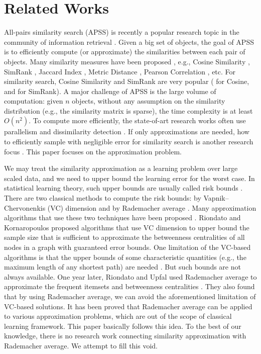 \documentclass{article}
\begin{document}
\section{Related Works}
\label{sec:rw}
All-pairs similarity search (APSS) is recently a popular research topic in the community of information retrieval \cite{BMS07,Xia16,ATY13,TAJY14}. Given a big set of objects, the goal of APSS is to efficiently compute (or approximate) the similarities between each pair of objects. Many similarity measures have been proposed \cite{SGM00}, e.g., Cosine Similarity \cite{TP07}, SimRank \cite{JW02}, Jaccard Index \cite{HHH89}, Metric Distance \cite{SGM00}, Pearson Correlation \cite{BCY09}, etc. For similarity search, Cosine Similarity and SimRank are very popular (\cite{TP07,Xia16,ATY13,TAJY14} for Cosine, and \cite{LH10,FNS13,KMK14,YM15} for SimRank). A major challenge of APSS is the large volume of computation: given $n$ objects, without any assumption on the similarity distribution (e.g., the similarity matrix is sparse), the time complexity is at least $O(n^2)$. To compute more efficiently, the state-of-art research works often use parallelism \cite{CCK12,HFL10} and dissimilarity detection \cite{ATY13,TAJY14}. If only approximations are needed, how to efficiently sample with negligible error for similarity search is another research focus \cite{GIM99,FKS03,IM98,Char02}. This paper focuses on the approximation problem.

We may treat the similarity approximation as a learning problem over large scaled data, and we need to upper bound the learning error for the worst case. In statistical learning theory, such upper bounds are usually called risk bounds \cite{Vap13}. There are two classical methods to compute the risk bounds: by Vapnik–Chervonenkis (VC) dimension \cite{VLL94,Vap98,Vap13} and by Rademacher average \cite{Mohri09,BM02,BBM05}. Many approximation algorithms that use these two techniques have been proposed \cite{RK14,RK16,RU15,RU16}. Riondato and Kornaropoulos \cite{RK14,RK16} proposed algorithms that use VC dimension to upper bound the sample size that is sufficient to approximate the betweenness centralities \cite{Bran01} of all nodes in a graph with guaranteed error bounds. One limitation of the VC-based algorithms is that the upper bounds of some characteristic quantities (e.g., the maximum length of any shortest path) are needed \cite{RK14,RK16,RU16}. But such bounds are not always available. One year later, Riondato and Upfal used Rademacher average to approximate the frequent itemsets \cite{RU15} and betweenness centralities \cite{RU16}. They also found that by using Rademacher average, we can avoid the aforementioned limitation of VC-based solutions. It has been proved that Rademacher average can be applied to various approximation problems, which are out of the scope of classical learning framework. This paper basically follows this idea. To the best of our knowledge, there is no research work connecting similarity approximation with Rademacher average. We attempt to fill this void.
\end{document}
